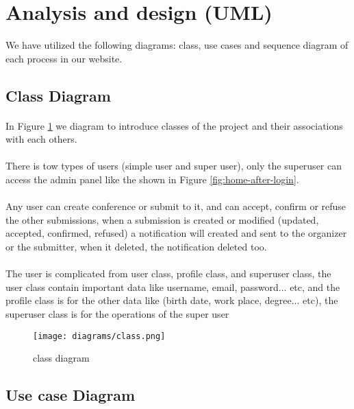 \section{Analysis and design (UML)}
We have utilized the following diagrams: class, use cases and sequence diagram of each process in our website.

	\subsection{Class Diagram}
	\paragraph{}
	In Figure \ref{fig:class-d} we diagram to introduce classes of the project and their associations with each others.
	\paragraph{}
	There is tow types of users (simple user and super user), only the superuser can access the admin panel like the shown in Figure \ref{fig:home-after-login}.
	\paragraph{}
	Any user can create conference or submit to it, and can accept, confirm or refuse the other submissions, when a submission is created or modified (updated, accepted, confirmed, refused) a notification will created and sent to the organizer or the submitter, when it deleted, the notification deleted too.
	\paragraph{}
	The user is complicated from user class, profile class, and superuser class, the user class contain important data like username, email, password... etc, and the profile class is for the other data like (birth date, work place, degree... etc), the superuser class is for the operations of the super user
	
		\begin{figure}[!ht]
			\centering
			\texttt{[image: diagrams/class.png]}
			\caption{class diagram}
			\label{fig:class-d}
		\end{figure}
	
	\subsection{Use case Diagram}
